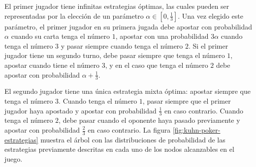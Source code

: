 El primer jugador tiene infinitas estrategias óptimas, las cuales pueden ser representadas por la elección de un parámetro $\alpha \in \left[ 0, \frac{1}{3} \right]$. Una vez elegido este parámetro, el primer jugador en su primera jugada debe apostar con probabilidad $\alpha$ cuando su carta tenga el número $1$, apostar con una probabilidad $3 \alpha$ cuando tenga el número $3$ y pasar siempre cuando tenga el número $2$. Si el primer jugador tiene un segundo turno, debe pasar siempre que tenga el número $1$, apostar cuando tiene el número $3$, y en el caso que tenga el número $2$ debe apostar con probabilidad $\alpha + \frac{1}{3}$.

El segundo jugador tiene una única estrategia mixta óptima: apostar siempre que tenga el número $3$. Cuando tenga el número $1$, pasar siempre que el primer jugador haya apostado y apostar con probabilidad $\frac{1}{3}$ en caso contrario. Cuando tenga el número $2$, debe pasar cuando el oponente haya pasado previamente y apostar con probabilidad $\frac{2}{3}$ en caso contrario. La figura \ref{fig:kuhn-poker-estrategias} muestra el árbol con las distribuciones de probabilidad de las estrategias previamente descritas en cada uno de los nodos alcanzables en el juego.
